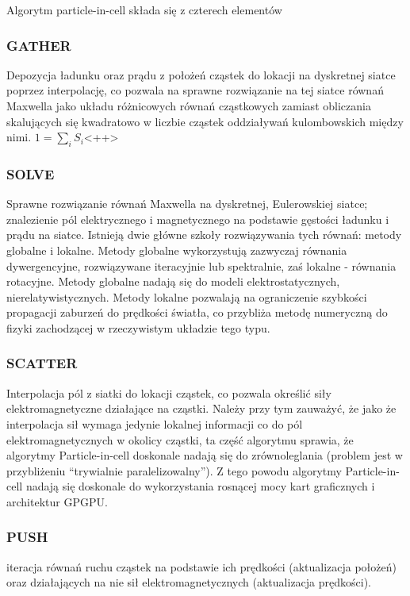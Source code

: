 Algorytm particle-in-cell składa się z czterech elementów %
\subsubsection{GATHER}
    Depozycja ładunku oraz prądu z położeń cząstek do lokacji na dyskretnej siatce poprzez interpolację,
    co pozwala na sprawne rozwiązanie na tej siatce
    równań Maxwella jako układu różnicowych równań cząstkowych zamiast obliczania skalujących się kwadratowo w liczbie cząstek
    oddziaływań kulombowskich między nimi.
    $1 = \sum_i S_i$<++> %
\subsubsection{SOLVE}
    Sprawne rozwiązanie równań Maxwella na dyskretnej, Eulerowskiej siatce;
    znalezienie pól elektrycznego i magnetycznego
    na podstawie gęstości ładunku i prądu na siatce.
    Istnieją dwie główne szkoły rozwiązywania tych równań: metody globalne i lokalne. Metody globalne wykorzystują
    zazwyczaj równania dywergencyjne, rozwiązywane iteracyjnie lub spektralnie,
    zaś lokalne - równania rotacyjne. Metody globalne nadają się do modeli elektrostatycznych, nierelatywistycznych.
    Metody lokalne pozwalają na ograniczenie szybkości propagacji zaburzeń do prędkości światła, co przybliża
    metodę numeryczną do fizyki zachodzącej w rzeczywistym układzie tego typu.
\subsubsection{SCATTER}
        Interpolacja pól z siatki do lokacji cząstek, co pozwala określić siły elektromagnetyczne działające na cząstki.
        Należy przy tym zauważyć, że jako że interpolacja sił wymaga jedynie lokalnej informacji co do pól
        elektromagnetycznych w okolicy cząstki, ta część algorytmu sprawia, że algorytmy Particle-in-cell doskonale
        nadają się do zrównoleglania (problem jest w przybliżeniu ``trywialnie paralelizowalny''). Z tego powodu algorytmy
        Particle-in-cell nadają się doskonale do wykorzystania rosnącej mocy kart graficznych i architektur GPGPU.
\subsubsection{PUSH}
    iteracja równań ruchu cząstek na podstawie ich prędkości (aktualizacja położeń)
    oraz działających na nie sił elektromagnetycznych (aktualizacja prędkości).

